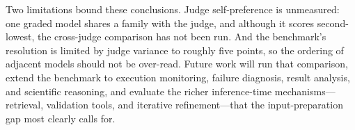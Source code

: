 \documentclass[conference]{IEEEtran}
\begin{document}
Two limitations bound these conclusions. Judge self-preference is unmeasured: one graded model shares a family with the judge, and although it scores second-lowest, the cross-judge comparison has not been run. And the benchmark's resolution is limited by judge variance to roughly five points, so the ordering of adjacent models should not be over-read. Future work will run that comparison, extend the benchmark to execution monitoring, failure diagnosis, result analysis, and scientific reasoning, and evaluate the richer inference-time mechanisms---retrieval, validation tools, and iterative refinement---that the input-preparation gap most clearly calls for.


%






\end{document}
